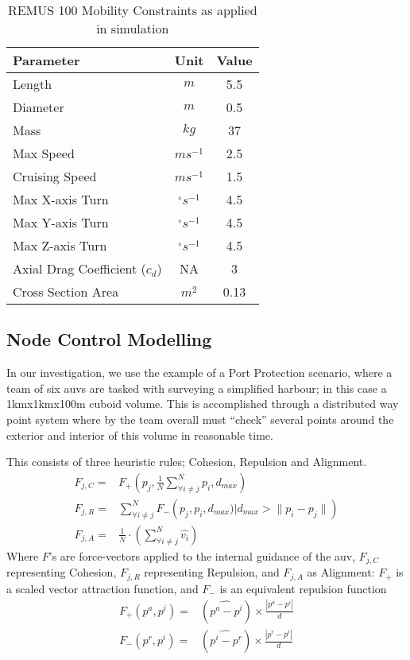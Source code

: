 \begin{table}
  \caption{REMUS 100 Mobility Constraints as applied in simulation} \label{tab:mobility_sysconstraints}
  \begin{center}
    \setlength{\tabcolsep}{8pt}
    \begin{tabular}{lcc}
      \toprule
      Parameter & Unit & Value \\
      \midrule
      Length & $m$ & 5.5\\
      Diameter & $m$ & 0.5\\
      Mass & $kg$ & 37 \\ 
      Max Speed & $ms^{-1}$ & 2.5\\
      Cruising Speed & $ms^{-1}$ & 1.5\\
      Max X-axis Turn & $^{\circ} s^{-1}$ & 4.5\\
      Max Y-axis Turn & $^{\circ} s^{-1}$ & 4.5\\
      Max Z-axis Turn & $^{\circ} s^{-1}$ & 4.5\\
      Axial Drag Coefficient ($c_d$) & NA & 3\\
      Cross Section Area & $m^2$ & 0.13\\
      \bottomrule
    \end{tabular}
    \setlength{\tabcolsep}{6pt}
  \end{center}
\end{table}

\subsection{Node Control Modelling}

In our investigation, we use the example of a Port Protection scenario, where a team of six \glspl{auv} are tasked with surveying a simplified harbour; in this case a 1kmx1kmx100m cuboid volume.
This is accomplished through a distributed way point system where by the team overall must ``check'' several points around the exterior and interior of this volume in reasonable time.

This consists of three heuristic rules; Cohesion, Repulsion and Alignment.
\begin{align}
  F_{j,C}=& F_+\left(p_j, \frac{1}{N}\sum\limits_{\forall i \ne j}^N{p_i}, d_{max}\right)\label{eq:fa}\\
  F_{j,R}=& \sum\limits_{\forall i \ne j}^N F_-\left(p_j, p_i, d_{max}) \big| d_{max}>\|p_i-p_j\|\right)\label{eq:fr}\\
  F_{j,A}=& \frac{1}{N}\cdot\left(\sum\limits_{\forall i \ne j}^N \hat{v_i}\right)\label{eq:fc}
\end{align}
Where $F$'s are force-vectors applied to the internal guidance of the \gls{auv}, $F_{j,C}$ representing Cohesion, $F_{j,R}$ representing Repulsion, and $F_{j,A}$ as Alignment: $F_+$ is a scaled vector attraction function, and $F_-$ is an equivalent repulsion function
\begin{align}
  F_+(p^a, p^i)=&(\widehat{p^a-p^i}) \times \frac{|p^a-p^i|}{d}\\
  F_-(p^r, p^i)=&(\widehat{p^i-p^r}) \times \frac{|p^r-p^i|}{d}
\end{align}


